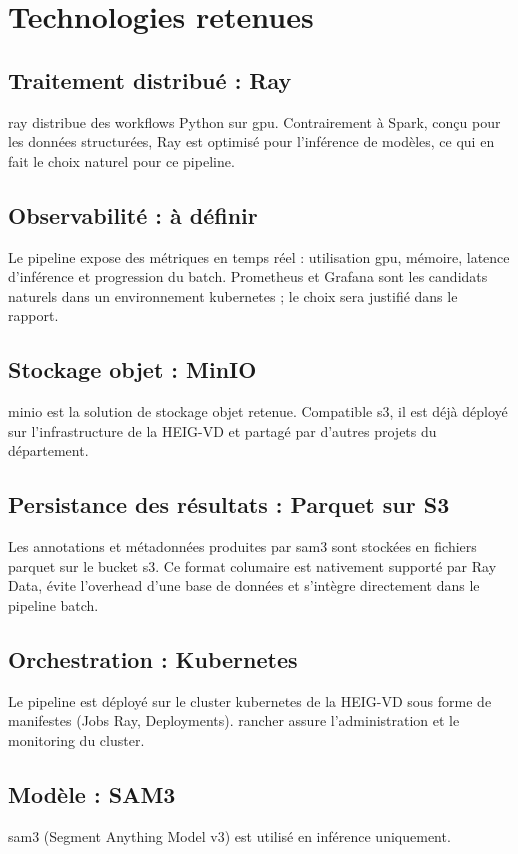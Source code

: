 \section{Technologies retenues}

\subsection{Traitement distribué : Ray}

\gls{ray} distribue des workflows Python sur \gls{gpu}.
Contrairement à Spark, conçu pour les données structurées, Ray est optimisé pour
l'inférence de modèles, ce qui en fait le choix naturel pour ce pipeline.

\subsection{Observabilité : à définir}

Le pipeline expose des métriques en temps réel : utilisation \gls{gpu}, mémoire,
latence d'inférence et progression du batch. Prometheus et Grafana sont les candidats
naturels dans un environnement \gls{kubernetes} ; le choix sera justifié dans le rapport.

\subsection{Stockage objet : MinIO}

\gls{minio} est la solution de stockage objet retenue. Compatible \gls{s3},
il est déjà déployé sur l'infrastructure de la HEIG-VD et partagé par d'autres projets du département.

\subsection{Persistance des résultats : Parquet sur S3}

Les annotations et métadonnées produites par \gls{sam3} sont stockées en fichiers
\gls{parquet} sur le bucket \gls{s3}. Ce format columaire est nativement supporté
par Ray Data, évite l'overhead d'une base de données et s'intègre directement
dans le pipeline batch.

\subsection{Orchestration : Kubernetes}

Le pipeline est déployé sur le cluster \gls{kubernetes} de la HEIG-VD sous forme
de manifestes (Jobs Ray, Deployments). \gls{rancher} assure l'administration
et le monitoring du cluster.

\subsection{Modèle : SAM3}

\gls{sam3} (Segment Anything Model v3) est utilisé en inférence uniquement.
